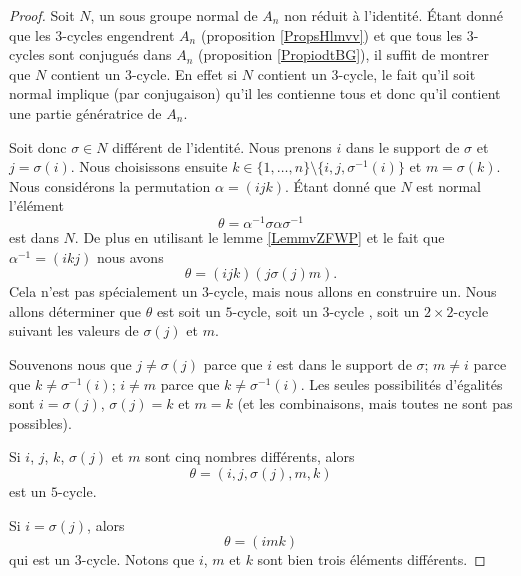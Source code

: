 \begin{proof}
    Soit \( N\), un sous groupe normal de \( A_n\) non réduit à l'identité. Étant donné que les \( 3\)-cycles engendrent \( A_n\) (proposition \ref{PropsHlmvv}) et que tous les \( 3\)-cycles sont conjugués dans \( A_n\) (proposition \ref{PropiodtBG}), il suffit de montrer que \( N\) contient un \( 3\)-cycle. En effet si \( N\) contient un \( 3\)-cycle, le fait qu'il soit normal implique (par conjugaison) qu'il les contienne tous et donc qu'il contient une partie génératrice de \( A_n\).

    Soit donc \( \sigma\in N\) différent de l'identité. Nous prenons \( i\) dans le support de \( \sigma\) et \( j=\sigma(i)\). Nous choisissons ensuite \( k\in\{ 1,\ldots, n \}\setminus\{ i,j,\sigma^{-1}(i) \}\) et \( m=\sigma(k)\). Nous considérons la permutation \( \alpha=(ijk)\). Étant donné que \( N\) est normal l'élément
    \begin{equation}
        \theta=\alpha^{-1}\sigma\alpha\sigma^{-1}
    \end{equation}
    est dans \( N\). De plus en utilisant le lemme \ref{LemmvZFWP} et le fait que \( \alpha^{-1}=(ikj)\) nous avons
    \begin{equation}
        \theta=(ijk)(j\sigma(j)m).
    \end{equation}
    Cela n'est pas spécialement un \( 3\)-cycle, mais nous allons en construire un. Nous allons déterminer que \( \theta\) est soit un \( 5\)-cycle, soit un \( 3\)-cycle , soit un \( 2\times 2\)-cycle suivant les valeurs de \( \sigma(j)\) et \( m\). 

    Souvenons nous que \( j\neq\sigma(j)\) parce que \( i\) est dans le support de \( \sigma\); \( m\neq i\) parce que \( k\neq \sigma^{-1}(i)\); \( i\neq m\) parce que \( k\neq \sigma^{-1}(i)\). Les seules possibilités d'égalités sont \( i=\sigma(j)\), \( \sigma(j)=k\) et \( m=k\) (et les combinaisons, mais toutes ne sont pas possibles).
    
    Si \( i\), \( j\), \( k\), \( \sigma(j)\) et \( m\) sont cinq nombres différents, alors 
    \begin{equation}
        \theta=(i,j,\sigma(j),m,k)
    \end{equation}
    est un \( 5\)-cycle.

    Si \( i=\sigma(j)\), alors
    \begin{equation}
        \theta=(imk)
    \end{equation}
    qui est un \( 3\)-cycle. Notons que \( i\), \( m\) et \( k\) sont bien trois éléments différents.


\end{proof}
